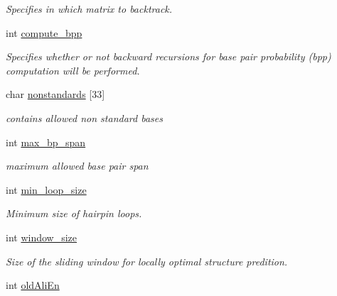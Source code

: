 \begin{DoxyCompactItemize}
\begin{DoxyCompactList}\small\item\em Specifies in which matrix to backtrack. \end{DoxyCompactList}\item 
\hypertarget{group__model__details_aa0c3e03d9064363e27adcc92b8d0380f}{int \hyperlink{group__model__details_aa0c3e03d9064363e27adcc92b8d0380f}{compute\-\_\-bpp}}\label{group__model__details_aa0c3e03d9064363e27adcc92b8d0380f}

\begin{DoxyCompactList}\small\item\em Specifies whether or not backward recursions for base pair probability (bpp) computation will be performed. \end{DoxyCompactList}\item 
\hypertarget{group__model__details_a25cb894b76ec876a679a45448dea5b0f}{char \hyperlink{group__model__details_a25cb894b76ec876a679a45448dea5b0f}{nonstandards} \mbox{[}33\mbox{]}}\label{group__model__details_a25cb894b76ec876a679a45448dea5b0f}

\begin{DoxyCompactList}\small\item\em contains allowed non standard bases \end{DoxyCompactList}\item 
\hypertarget{group__model__details_a659e5fcc6e8c9f1a68e7de6548eef3b0}{int \hyperlink{group__model__details_a659e5fcc6e8c9f1a68e7de6548eef3b0}{max\-\_\-bp\-\_\-span}}\label{group__model__details_a659e5fcc6e8c9f1a68e7de6548eef3b0}

\begin{DoxyCompactList}\small\item\em maximum allowed base pair span \end{DoxyCompactList}\item 
int \hyperlink{group__model__details_a9ed7ba42fcc46915c5c0c524f3d255f5}{min\-\_\-loop\-\_\-size}
\begin{DoxyCompactList}\small\item\em Minimum size of hairpin loops. \end{DoxyCompactList}\item 
\hypertarget{group__model__details_abea42f9229f8d8d6bcbedef316315bfc}{int \hyperlink{group__model__details_abea42f9229f8d8d6bcbedef316315bfc}{window\-\_\-size}}\label{group__model__details_abea42f9229f8d8d6bcbedef316315bfc}

\begin{DoxyCompactList}\small\item\em Size of the sliding window for locally optimal structure predition. \end{DoxyCompactList}\item 
\hypertarget{group__model__details_ab53aec4503130877973c6111ae6f0f76}{int \hyperlink{group__model__details_ab53aec4503130877973c6111ae6f0f76}{old\-Ali\-En}}\label{group__model__details_ab53aec4503130877973c6111ae6f0f76}


\end{DoxyCompactItemize}
